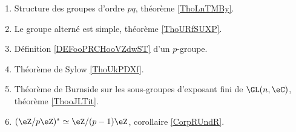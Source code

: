 
\begin{enumerate}
    \item Structure des groupes d'ordre \( pq\), théorème \ref{ThoLnTMBy}.
    \item Le groupe alterné est simple, théorème \ref{ThoURfSUXP}.
    \item Définition \ref{DEFooPRCHooVZdwST} d'un \( p\)-groupe.
    \item Théorème de Sylow \ref{ThoUkPDXf}. 
    \item Théorème de Burnside sur les sous-groupes d'exposant fini de \( \GL(n,\eC)\), théorème \ref{ThooJLTit}.
    \item \( (\eZ/p\eZ)^*\simeq \eZ/(p-1)\eZ\), corollaire \ref{CorpRUndR}.
\end{enumerate}

